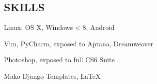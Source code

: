\documentclass[line,margin]{res}
\begin{document}
\begin{resume}
\section{SKILLS}
 \begin{description} \itemsep -2pt
 \item[Operating Systems:] Linux, OS X, Windows < 8, Android
 \item[Environments:] Vim, PyCharm, exposed to Aptana, Dreamweaver
 \item[Design:] Photoshop, exposed to full CS6 Suite
 \item[Markup:] Mako Django Templates, \LaTeX
 \end{description}
					

\end{resume}
\end{document}
